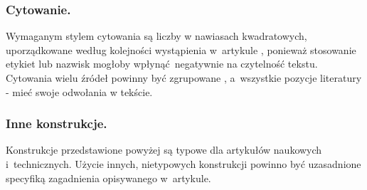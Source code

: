 \subsubsection{Cytowanie.}
\label{subsubsec:cite}

Wymaganym stylem cytowania są liczby w nawiasach kwadratowych, uporządkowane według kolejności wystąpienia w~artykule \cite{ref:lncs}, ponieważ stosowanie etykiet lub nazwisk mogłoby wpłynąć negatywnie na czytelność tekstu. Cytowania wielu źródeł powinny być zgrupowane \cite{ref:lncs,ref:latex}, a~wszystkie pozycje literatury - mieć swoje odwołania w tekście.

\subsubsection{Inne konstrukcje.}
\label{subsubsec:others}

Konstrukcje przedstawione powyżej są typowe dla artykułów naukowych i~technicznych. Użycie innych, nietypowych konstrukcji powinno być uzasadnione specyfiką zagadnienia opisywanego w~artykule.
